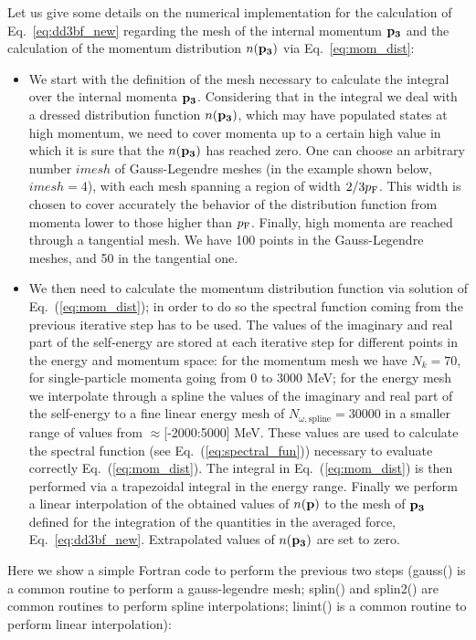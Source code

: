 Let us give some details on the numerical implementation for the calculation of Eq.~\eqref{eq:dd3bf_new} regarding the mesh of the internal momentum ${\bf p_3}$ and the calculation of the momentum distribution $n({\bf p_3})$ via Eq.~\eqref{eq:mom_dist}:
\begin{itemize}
\item We start with the definition of the mesh necessary to calculate the integral over the internal momenta ${\bf p_3}$. Considering that in the integral we deal with a dressed distribution function $n({\bf p_3})$, which may have populated states at high momentum, we need to cover momenta up to a certain high value in which it is sure that the $n({\bf p_3})$ has reached zero. One can choose an arbitrary number $imesh$ of Gauss-Legendre meshes (in the example shown below, $imesh=4$), with each mesh spanning a region of width $2/3 p_{\rm F}$. This width is chosen to cover accurately the behavior of the distribution function from momenta lower to those higher than $p_\textrm F$. Finally, high momenta are reached through a tangential mesh. We have 100  points in the Gauss-Legendre meshes, and 50 in the tangential one. 
\item We then need to calculate the momentum distribution function via solution of Eq.~(\ref{eq:mom_dist}); in order to do so the spectral function coming from the previous iterative step has to be used. The values of the imaginary and real part of the self-energy are stored at each iterative step for different points in the energy and momentum space: for the momentum mesh we have $N_k=70$, for single-particle momenta going from 0 to 3000 MeV; for the energy mesh we interpolate through a spline the values of the imaginary and real part of the self-energy to a fine linear energy mesh of $N_{\omega,\textrm{spline}}=30000$ in a smaller range of values from $\approx$[-2000:5000] MeV. These values are used to calculate the spectral function (see Eq.~(\ref{eq:spectral_fun})) necessary to evaluate correctly Eq.~(\ref{eq:mom_dist}). The integral in Eq.~(\ref{eq:mom_dist}) is then performed via a trapezoidal integral in the energy range. Finally we perform a linear interpolation of the obtained values of $n({\bf p})$ to the mesh of ${\bf p_3}$ defined for the integration of the quantities in the averaged force, Eq.~\eqref{eq:dd3bf_new}. Extrapolated values of $n({\bf p_3})$ are set to zero.
\end{itemize}

\noindent
Here we show a simple Fortran code to perform the previous two steps (gauss() is a common routine to perform a gauss-legendre mesh; splin() and splin2() are common routines to perform spline interpolations; linint() is a common routine to perform linear interpolation):

